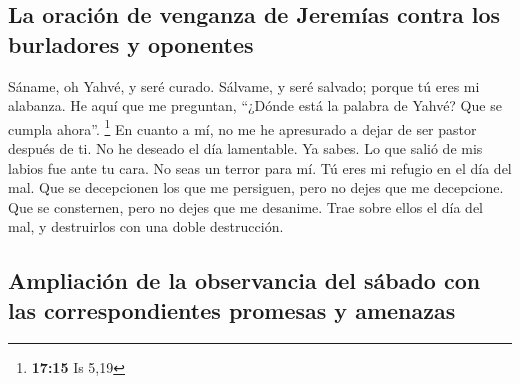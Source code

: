 \hypertarget{la-oraciuxf3n-de-venganza-de-jeremuxedas-contra-los-burladores-y-oponentes}{%
\subsection{La oración de venganza de Jeremías contra los burladores y
oponentes}\label{la-oraciuxf3n-de-venganza-de-jeremuxedas-contra-los-burladores-y-oponentes}}

 Sáname, oh Yahvé, y seré curado. Sálvame, y seré
salvado; porque tú eres mi alabanza.  He aquí que me
preguntan, ``¿Dónde está la palabra de Yahvé? Que se cumpla ahora''.
\footnote{\textbf{17:15} Is 5,19}  En cuanto a mí, no me
he apresurado a dejar de ser pastor después de ti. No he deseado el día
lamentable. Ya sabes. Lo que salió de mis labios fue ante tu cara.
 No seas un terror para mí. Tú eres mi refugio en el día
del mal.  Que se decepcionen los que me persiguen, pero
no dejes que me decepcione. Que se consternen, pero no dejes que me
desanime. Trae sobre ellos el día del mal, y destruirlos con una doble
destrucción.

\hypertarget{ampliaciuxf3n-de-la-observancia-del-suxe1bado-con-las-correspondientes-promesas-y-amenazas}{%
\subsection{Ampliación de la observancia del sábado con las
correspondientes promesas y
amenazas}\label{ampliaciuxf3n-de-la-observancia-del-suxe1bado-con-las-correspondientes-promesas-y-amenazas}}

